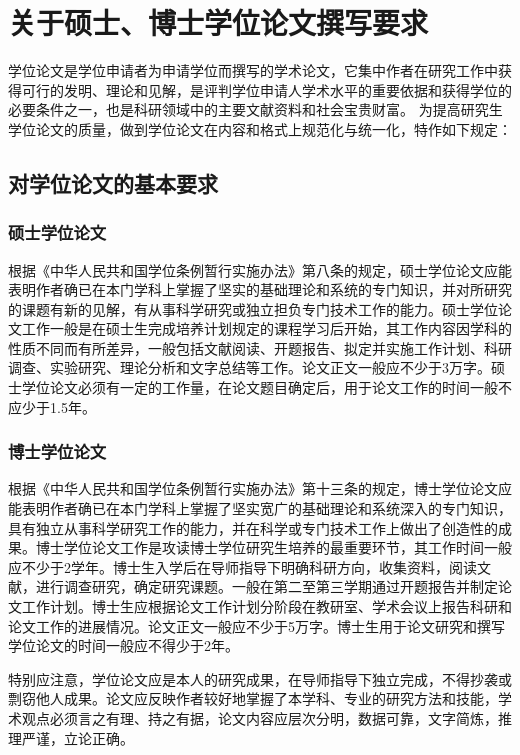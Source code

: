 ﻿
\chapter{关于硕士、博士学位论文撰写要求}
\label{chap:requires}

学位论文是学位申请者为申请学位而撰写的学术论文，它集中作者在研究工作中获得可行的发明、理论和见解，是评判学位申请人学术水平的重要依据和获得学位的必要条件之一，也是科研领域中的主要文献资料和社会宝贵财富。
为提高研究生学位论文的质量，做到学位论文在内容和格式上规范化与统一化，特作如下规定：

\section{对学位论文的基本要求}



\subsection{硕士学位论文}

根据《中华人民共和国学位条例暂行实施办法》第八条的规定，硕士学位论文应能表明作者确已在本门学科上掌握了坚实的基础理论和系统的专门知识，并对所研究的课题有新的见解，有从事科学研究或独立担负专门技术工作的能力。硕士学位论文工作一般是在硕士生完成培养计划规定的课程学习后开始，其工作内容因学科的性质不同而有所差异，一般包括文献阅读、开题报告、拟定并实施工作计划、科研调查、实验研究、理论分析和文字总结等工作。论文正文一般应不少于3万字。硕士学位论文必须有一定的工作量，在论文题目确定后，用于论文工作的时间一般不应少于1.5年。

\subsection{博士学位论文}

根据《中华人民共和国学位条例暂行实施办法》第十三条的规定，博士学位论文应能表明作者确已在本门学科上掌握了坚实宽广的基础理论和系统深入的专门知识，具有独立从事科学研究工作的能力，并在科学或专门技术工作上做出了创造性的成果。博士学位论文工作是攻读博士学位研究生培养的最重要环节，其工作时间一般应不少于2学年。博士生入学后在导师指导下明确科研方向，收集资料，阅读文献，进行调查研究，确定研究课题。一般在第二至第三学期通过开题报告并制定论文工作计划。博士生应根据论文工作计划分阶段在教研室、学术会议上报告科研和论文工作的进展情况。论文正文一般应不少于5万字。博士生用于论文研究和撰写学位论文的时间一般应不得少于2年。

特别应注意，学位论文应是本人的研究成果，在导师指导下独立完成，不得抄袭或剽窃他人成果。论文应反映作者较好地掌握了本学科、专业的研究方法和技能，学术观点必须言之有理、持之有据，论文内容应层次分明，数据可靠，文字简炼，推理严谨，立论正确。

